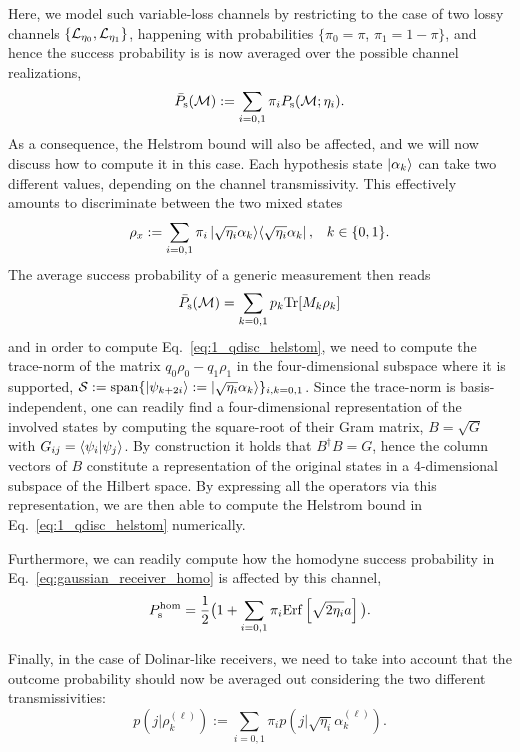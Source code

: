 Here, we model such variable-loss channels by restricting to the case of two lossy channels $\{{\cal L}_{\eta_0}, {\cal L}_{\eta_1}\}$, happening with probabilities $\{\pi_0=\pi$, $\pi_1=1-\pi\}$, and hence the success probability%
is is now averaged over the possible channel realizations,
\begin{equation}\label{eq:meanps}
    \bar P_{\rm s}({\cal M}):=\sum_{i=0,1}\pi_i  P_{\rm s}({\cal M};\eta_i).
\end{equation}
As a consequence, the Helstrom bound will also be affected, and we will now discuss how to compute it in this case. Each hypothesis state $\ket{\alpha_k}$ can take two different values, depending on the channel transmissivity. This effectively amounts to discriminate between the two mixed states
\begin{equation}
\rho_{x}:=\sum_{i=0,1}\pi_{i}\proj{\sqrt{\eta_{i}}\alpha_{k}}, \;\;\;k\in\{0,1 \} .
\end{equation}
The average success probability of a generic measurement then reads
\begin{equation}\label{eq:pscom}
\bar P_{\rm s}({\cal M})=\sum_{k=0,1}p_{k}\text{Tr}[M_{k}\rho_{k}]
\end{equation}
and in order to compute Eq.~\ref{eq:1_qdisc_helstom}, we need to compute the trace-norm of the matrix $q_0\rho_0-q_1\rho_1$ in the four-dimensional subspace where it is supported, ${\cal S}:={\rm span}\{\ket{\psi_{k+2i}}:=\ket{\sqrt{\eta_{i}}\alpha_{k}}\}_{i,k=0,1}$. Since the trace-norm is basis-independent, one can readily find a four-dimensional representation of the involved states by computing the square-root of their Gram matrix, $B=\sqrt{G}$ with $G_{ij}=\langle \psi_i | \psi_j \rangle$.
By construction it holds that $B^\dagger B= G$, hence the column vectors of $B$ constitute a representation of the original states in a $4$-dimensional subspace of the Hilbert space. By expressing all the operators via this representation, we are then able to compute the Helstrom bound in Eq.~\eqref{eq:1_qdisc_helstom} numerically.

Furthermore, we can readily compute how the homodyne success probability in Eq.~\ref{eq:gaussian_receiver_homo} is affected by this channel,
 \begin{equation}\label{eq:homodynecompo}
  P_{\rm s}^{\rm hom}=\frac{1}{2} \big( 1 + \sum_{i=0,1}\pi_{i}{\rm Erf}\left[{\sqrt{2\eta_{i}} a }\right]\big).
 \end{equation}

Finally, in the case of Dolinar-like receivers, we need to take into account that the outcome probability should now be averaged out considering the two different transmissivities:
\begin{equation}
p(j|\rho^{(\ell)}_{k}):=\sum_{i=0,1}\pi_{i}p(j|\sqrt{\eta_{i}}\alpha^{(\ell)}_{k}).
\end{equation}

